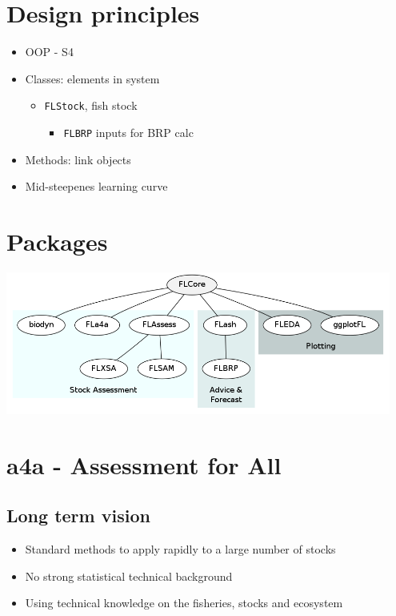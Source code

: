 \documentclass[]{article}
\providecommand{\tightlist}{%
  \setlength{\itemsep}{0pt}\setlength{\parskip}{0pt}}
\begin{document}
\section{Design principles}\label{design-principles}

\begin{itemize}
\tightlist
\item
  OOP - S4
\item
  Classes: elements in system

  \begin{itemize}
  \tightlist
  \item
    \texttt{FLStock}, fish stock

    \begin{itemize}
    \tightlist
    \item
      \texttt{FLBRP} inputs for BRP calc
    \end{itemize}
  \end{itemize}
\item
  Methods: link objects
\item
  Mid-steepenes learning curve
\end{itemize}

\section{Packages}\label{packages}

\centering
\includegraphics[keepaspectratio, width=0.95\textwidth]{graphics/flrpkgs.png}

\section{a4a - Assessment for All}\label{a4a---assessment-for-all}

\subsection{Long term vision}\label{long-term-vision}

\begin{itemize}
\tightlist
\item
  Standard methods to apply rapidly to a large number of stocks
\item
  No strong statistical technical background
\item
  Using technical knowledge on the fisheries, stocks and ecosystem
\end{itemize}
\end{document}
